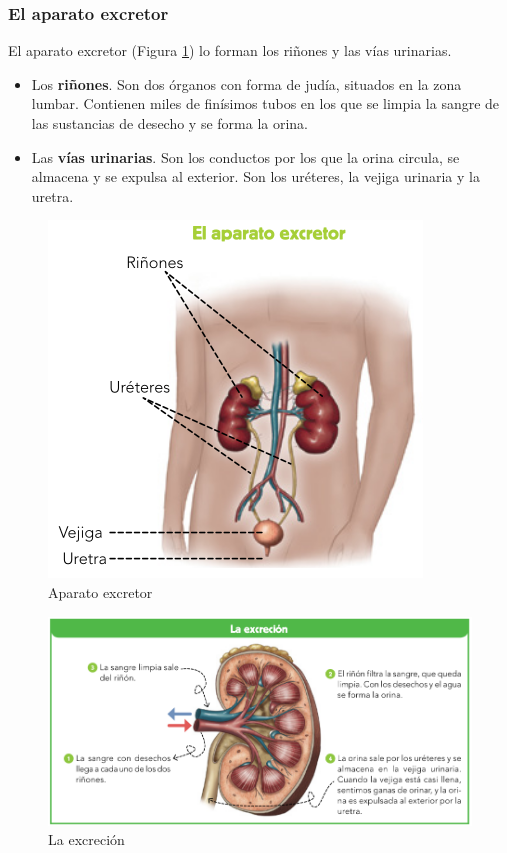 \subsubsection{El aparato excretor}

El aparato excretor (Figura \ref{fig:aparato-excretor}) lo forman los riñones y las vías urinarias.

\begin{itemize}
    \item Los \textbf{riñones}. Son dos órganos con forma de judía, situados en la zona lumbar. Contienen miles de finísimos tubos en los que se limpia la sangre de las sustancias de desecho y se forma la orina.
    \item Las \textbf{vías urinarias}. Son los conductos por los que la orina circula, se almacena y se expulsa al exterior. Son los uréteres, la vejiga urinaria y la uretra.
\end{itemize}

\begin{figure}[!ht]
    \centering
    \includegraphics[width=0.7\linewidth]{Tema3/09_Aparato_excretor.png}
    \caption{Aparato excretor}
    \label{fig:aparato-excretor}
\end{figure}

\begin{figure}[!ht]
    \centering
    \includegraphics[width=1\linewidth]{Tema3/10_Excrecion.png}
    \caption{La excreción}
    \label{fig:excrecion}
\end{figure}

